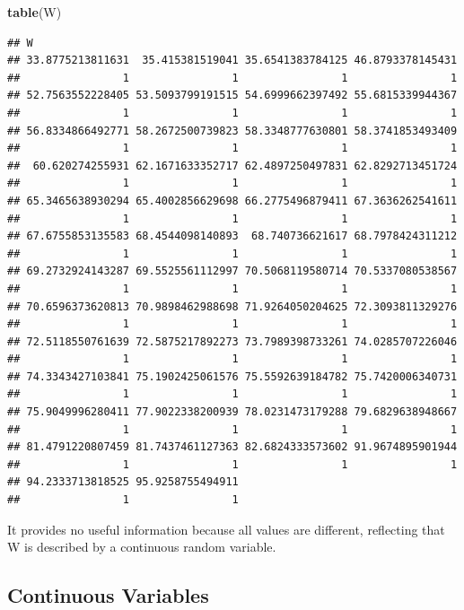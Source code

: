 \documentclass[
]{article}
\newenvironment{Shaded}{\begin{snugshade}}{\end{snugshade}}
\newcommand{\FunctionTok}[1]{\textcolor[rgb]{0.13,0.29,0.53}{\textbf{#1}}}
\newcommand{\NormalTok}[1]{#1}
\begin{document}
\begin{Shaded}
\begin{Highlighting}[]
\FunctionTok{table}\NormalTok{(W)}
\end{Highlighting}
\end{Shaded}

\begin{verbatim}
## W
## 33.8775213811631  35.415381519041 35.6541383784125 46.8793378145431 
##                1                1                1                1 
## 52.7563552228405 53.5093799191515 54.6999662397492 55.6815339944367 
##                1                1                1                1 
## 56.8334866492771 58.2672500739823 58.3348777630801 58.3741853493409 
##                1                1                1                1 
##  60.620274255931 62.1671633352717 62.4897250497831 62.8292713451724 
##                1                1                1                1 
## 65.3465638930294 65.4002856629698 66.2775496879411 67.3636262541611 
##                1                1                1                1 
## 67.6755853135583 68.4544098140893  68.740736621617 68.7978424311212 
##                1                1                1                1 
## 69.2732924143287 69.5525561112997 70.5068119580714 70.5337080538567 
##                1                1                1                1 
## 70.6596373620813 70.9898462988698 71.9264050204625 72.3093811329276 
##                1                1                1                1 
## 72.5118550761639 72.5875217892273 73.7989398733261 74.0285707226046 
##                1                1                1                1 
## 74.3343427103841 75.1902425061576 75.5592639184782 75.7420006340731 
##                1                1                1                1 
## 75.9049996280411 77.9022338200939 78.0231473179288 79.6829638948667 
##                1                1                1                1 
## 81.4791220807459 81.7437461127363 82.6824333573602 91.9674895901944 
##                1                1                1                1 
## 94.2333713818525 95.9258755494911 
##                1                1
\end{verbatim}

It provides no useful information because all values are different,
reflecting that W is described by a continuous random variable.

\hypertarget{continuous-variables}{%
\subsection{Continuous Variables}\label{continuous-variables}}
\end{document}
